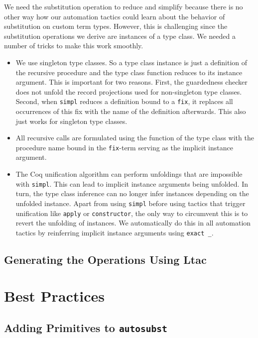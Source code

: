 \documentclass{scrartcl}
\newcommand{\lst}{\lstinline}
\begin{document}
We need the substitution operation to reduce and simplify because there is no other way how our automation tactics could learn about the behavior of substitution on custom term types. However, this is challenging since the substitution operations we derive are instances of a type class. We needed a number of tricks to make this work smoothly.
\begin{itemize}
\item We use singleton type classes. So a type class instance is just a definition of the recursive procedure and the type class function reduces to its instance argument. This is important for two reasons. 
First, the guardedness checker does not unfold the record projections used for non-singleton type classes.
Second, when \lst$simpl$ reduces a definition bound to a \lst$fix$, it replaces all occurrences of this fix with the name of the definition afterwards. This also just works for singleton type classes.
\item All recursive calls are formulated using the function of the type class with the procedure name bound in the \lst$fix$-term serving as the implicit instance argument.
\item The Coq unification algorithm can perform unfoldings that are impossible with \lst$simpl$. This can lead to implicit instance arguments being unfolded. In turn, the type class inference can no longer infer instances depending on the unfolded instance. Apart from using \lst$simpl$ before using tactics that trigger unification like \lst$apply$ or \lst$constructor$, the only way to circumvent this is to revert the unfolding of instances. We automatically do this in all automation tactics by reinferring implicit instance arguments using \lst$exact _$.

\end{itemize}

\subsection{Generating the Operations Using Ltac}
\label{sec:gener-ltac}



\section{Best Practices}
\label{sec:best-practices}



\subsection{Adding Primitives to \lst$autosubst$}
\label{sec:adding-prim}
\end{document}
